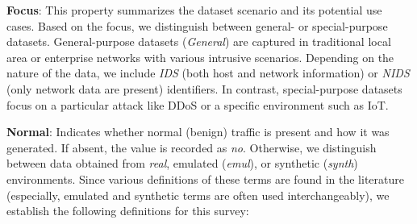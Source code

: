 \textbf{Focus}: This property summarizes the dataset scenario and its potential use cases. Based on the focus, we distinguish between general- or special-purpose datasets. General-purpose datasets (\emph{General}) are captured in traditional local area or enterprise networks with various intrusive scenarios. Depending on the nature of the data, we include \emph{IDS} (both host and network information) or \emph{NIDS} (only network data are present) identifiers. In contrast, special-purpose datasets focus on a particular attack like DDoS or a specific environment such as IoT.

\textbf{Normal}: Indicates whether normal (benign) traffic is present and how it was generated. If absent, the value is recorded as \emph{no}. Otherwise, we distinguish between data obtained from \emph{real}, emulated (\emph{emul}), or synthetic (\emph{synth}) environments. Since various definitions of these terms are found in the literature (especially, emulated and synthetic terms are often used interchangeably), we establish the following definitions for this survey:

